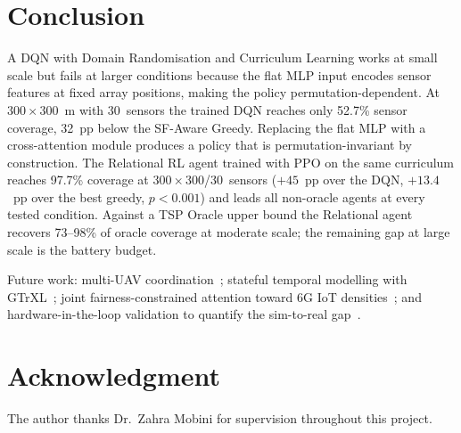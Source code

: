 \documentclass[conference]{IEEEtran}
\begin{document}
\section{Conclusion}

A DQN with Domain Randomisation and Curriculum Learning works at small scale but fails at larger conditions because the flat MLP input encodes sensor features at fixed array positions, making the policy permutation-dependent. At $300{\times}300$~m with 30~sensors the trained DQN reaches only 52.7\% sensor coverage, 32~pp below the SF-Aware Greedy. Replacing the flat MLP with a cross-attention module produces a policy that is permutation-invariant by construction. The Relational RL agent trained with PPO on the same curriculum reaches 97.7\% coverage at $300{\times}300$/30~sensors ($+45$~pp over the DQN, $+13.4$~pp over the best greedy, $p{<}0.001$) and leads all non-oracle agents at every tested condition. Against a TSP Oracle upper bound the Relational agent recovers 73--98\% of oracle coverage at moderate scale; the remaining gap at large scale is the battery budget.

Future work: multi-UAV coordination~\cite{lee2025quasi,ahmed2026marl}; stateful temporal modelling with GTrXL~\cite{parisotto2020gtrxl}; joint fairness-constrained attention toward 6G IoT densities~\cite{nguyen20226g}; and hardware-in-the-loop validation to quantify the sim-to-real gap~\cite{zhao2021sim2real}.

\section*{Acknowledgment}
The author thanks Dr.\ Zahra Mobini for supervision throughout this project.
\end{document}
